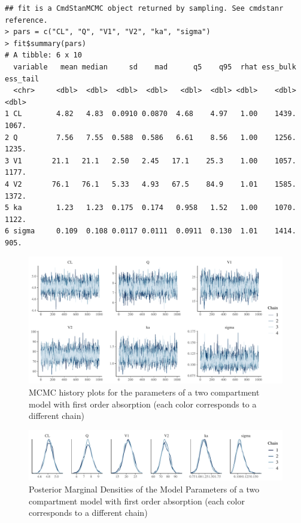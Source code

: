 \documentclass[10pt, reqno, oneside]{amsbook}
\numberwithin{equation}{chapter}
\numberwithin{figure}{chapter}
\numberwithin{table}{chapter}
\theoremstyle{remark}
\begin{document}
\begin{verbatim}
## fit is a CmdStanMCMC object returned by sampling. See cmdstanr reference.
> pars = c("CL", "Q", "V1", "V2", "ka", "sigma")
> fit$summary(pars)
# A tibble: 6 x 10
  variable   mean median     sd    mad      q5    q95  rhat ess_bulk ess_tail
  <chr>     <dbl>  <dbl>  <dbl>  <dbl>   <dbl>  <dbl> <dbl>    <dbl>    <dbl>
1 CL        4.82   4.83  0.0910 0.0870  4.68    4.97   1.00    1439.    1067.
2 Q         7.56   7.55  0.588  0.586   6.61    8.56   1.00    1256.    1235.
3 V1       21.1   21.1   2.50   2.45   17.1    25.3    1.00    1057.    1177.
4 V2       76.1   76.1   5.33   4.93   67.5    84.9    1.01    1585.    1372.
5 ka        1.23   1.23  0.175  0.174   0.958   1.52   1.00    1070.    1122.
6 sigma     0.109  0.108 0.0117 0.0111  0.0911  0.130  1.01    1414.     905.
\end{verbatim}

\begin{figure}[htbp]
\centering
\includegraphics[width=\linewidth]{../example-models/pk2cpt/deliv/figure/history.pdf}
\caption{\label{twocpt_mcmc_history}
MCMC history plots for the parameters of a two compartment model with first order absorption (each color corresponds to a different chain)}
\end{figure}

\begin{figure}[htbp]
\centering
\includegraphics[width=\linewidth]{../example-models/pk2cpt/deliv/figure/density.pdf}
\caption{\label{twocpt_mcmc_posterior}
Posterior Marginal Densities of the Model Parameters of a two compartment model with first order absorption (each color corresponds to a different chain)}
\end{figure}
\end{document}
